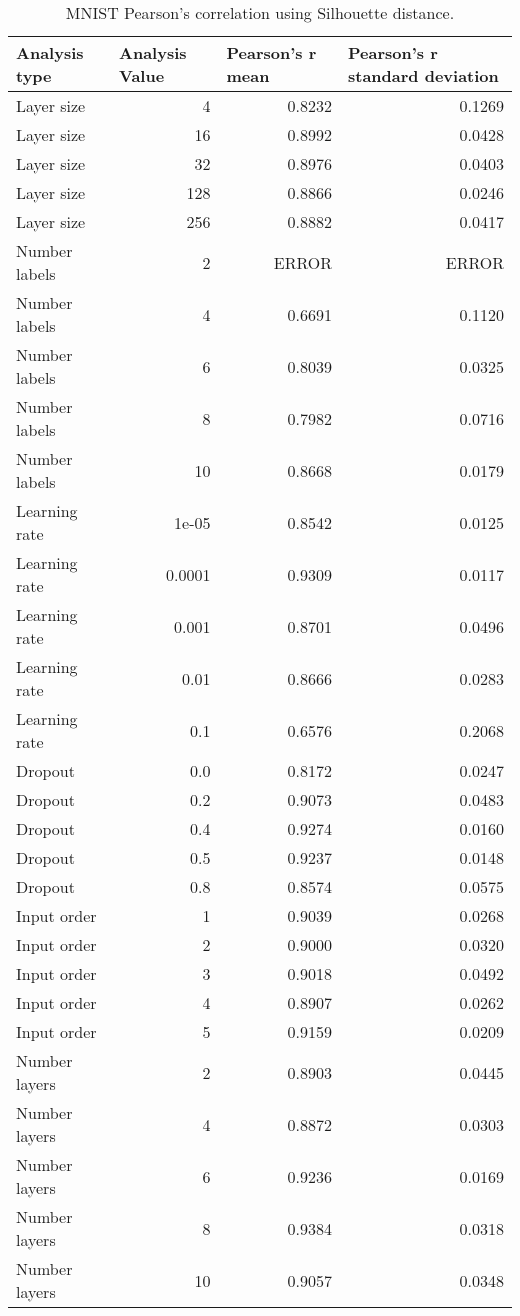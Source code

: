 \documentclass{article}
\begin{document}
\begin{table}[H]
\centering
\begin{tabular}{@{}lrrr@{}}
\toprule
Analysis type & \multicolumn{1}{l}{Analysis Value} & \multicolumn{1}{l}{Pearson's r mean} & \multicolumn{1}{l}{Pearson's r standard deviation} \\ \midrule
Layer size & 4 & 0.8232 & 0.1269 \\ 
Layer size & 16 & 0.8992 & 0.0428 \\ 
Layer size & 32 & 0.8976 & 0.0403 \\ 
Layer size & 128 & 0.8866 & 0.0246 \\ 
Layer size & 256 & 0.8882 & 0.0417 \\ 
Number labels & 2 & ERROR & ERROR \\ 
Number labels & 4 & 0.6691 & 0.1120 \\ 
Number labels & 6 & 0.8039 & 0.0325 \\ 
Number labels & 8 & 0.7982 & 0.0716 \\ 
Number labels & 10 & 0.8668 & 0.0179 \\ 
Learning rate & 1e-05 & 0.8542 & 0.0125 \\ 
Learning rate & 0.0001 & 0.9309 & 0.0117 \\ 
Learning rate & 0.001 & 0.8701 & 0.0496 \\ 
Learning rate & 0.01 & 0.8666 & 0.0283 \\ 
Learning rate & 0.1 & 0.6576 & 0.2068 \\ 
Dropout & 0.0 & 0.8172 & 0.0247 \\ 
Dropout & 0.2 & 0.9073 & 0.0483 \\ 
Dropout & 0.4 & 0.9274 & 0.0160 \\ 
Dropout & 0.5 & 0.9237 & 0.0148 \\ 
Dropout & 0.8 & 0.8574 & 0.0575 \\ 
Input order & 1 & 0.9039 & 0.0268 \\ 
Input order & 2 & 0.9000 & 0.0320 \\ 
Input order & 3 & 0.9018 & 0.0492 \\ 
Input order & 4 & 0.8907 & 0.0262 \\ 
Input order & 5 & 0.9159 & 0.0209 \\ 
Number layers & 2 & 0.8903 & 0.0445 \\ 
Number layers & 4 & 0.8872 & 0.0303 \\ 
Number layers & 6 & 0.9236 & 0.0169 \\ 
Number layers & 8 & 0.9384 & 0.0318 \\ 
Number layers & 10 & 0.9057 & 0.0348 \\ 
\bottomrule
\end{tabular}
\caption{MNIST Pearson's correlation using Silhouette distance.}
\end{table}
\end{document}
